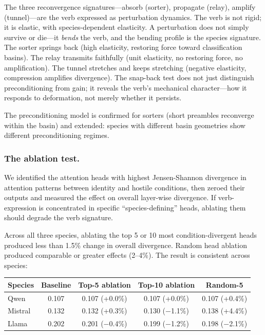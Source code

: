 \documentclass[12pt]{article}
\begin{document}
The three reconvergence signatures---absorb (sorter), propagate (relay), amplify (tunnel)---are the verb expressed as perturbation dynamics. The verb is not rigid; it is elastic, with species-dependent elasticity. A perturbation does not simply survive or die---it \emph{bends} the verb, and the bending profile is the species signature. The sorter springs back (high elasticity, restoring force toward classification basins). The relay transmits faithfully (unit elasticity, no restoring force, no amplification). The tunnel stretches and keeps stretching (negative elasticity, compression amplifies divergence). The snap-back test does not just distinguish preconditioning from gain; it reveals the verb's mechanical character---how it responds to deformation, not merely whether it persists.

The preconditioning model is confirmed for sorters (short preambles reconverge within the basin) and extended: species with different basin geometries show different preconditioning regimes.

\subsubsection*{The ablation test.} We identified the attention heads with highest Jensen-Shannon divergence in attention patterns between identity and hostile conditions, then zeroed their outputs and measured the effect on overall layer-wise divergence. If verb-expression is concentrated in specific ``species-defining'' heads, ablating them should degrade the verb signature.

Across all three species, ablating the top 5 or 10 most condition-divergent heads produced less than 1.5\% change in overall divergence. Random head ablation produced comparable or greater effects (2--4\%). The result is consistent across species:

\begin{table}[htbp]
\centering
\begin{tabular}{lcccc}
\toprule
Species & Baseline & Top-5 ablation & Top-10 ablation & Random-5 \\
\midrule
Qwen    & 0.107    & 0.107 (+0.0\%) & 0.107 (+0.0\%)  & 0.107 (+0.4\%) \\
Mistral & 0.132    & 0.132 (+0.3\%) & 0.130 ($-$1.1\%)  & 0.138 (+4.4\%) \\
Llama   & 0.202    & 0.201 ($-$0.4\%) & 0.199 ($-$1.2\%)  & 0.198 ($-$2.1\%) \\
\bottomrule
\end{tabular}
\end{table}
\end{document}
